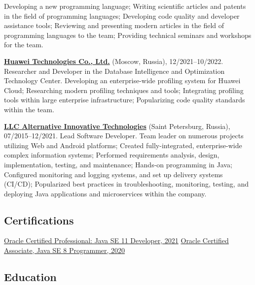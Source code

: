 \documentclass{vl}
\begin{document}
    Developing a new programming language;
    Writing scientific articles and patents in the field of programming languages;
    Developing code quality and developer assistance tools;
    Reviewing and presenting modern articles in the field of programming languages to the team;
    Providing technical seminars and workshops for the team.

    \textbf{\href{https://www.huawei.com}{Huawei Technologies Co., Ltd.}} (Moscow, Russia), 12/2021--10/2022.\newline
    Researcher and Developer in the Database Intelligence and Optimization Technology Center.\newline
    Developing an enterprise-wide profiling system for Huawei Cloud;
    Researching modern profiling techniques and tools;
    Integrating profiling tools within large enterprise infrastructure;
    Popularizing code quality standards within the team.

    \textbf{\href{https://altinntech.com/en/}{LLC Alternative Innovative Technologies}} (Saint Petersburg, Russia), 07/2015--12/2021.
    Lead Software Developer.\newline
    Team leader on numerous projects utilizing Web and Android platforms;
    Created fully-integrated, enterprise-wide complex information systems;
    Performed requirements analysis, design, implementation, testing, and maintenance;
    Hands-on programming in Java;
    Configured monitoring and logging systems, and set up delivery systems (CI/CD);
    Popularized best practices in troubleshooting, monitoring, testing, and deploying Java applications
    and microservices within the company.

    \subsection*{Certifications}

    \href{https://catalog-education.oracle.com/pls/certview/sharebadge?id=87F6A2FE819A5A5AF4120A05900AB28A461EE9A3EE9FBFA02721FADAEB3BCE19}{Oracle Certified Professional: Java SE 11 Developer, 2021}
    \newline
    \href{https://www.credly.com/badges/e2d9ddda-20dc-433d-8ab7-18548fd0fd8f/public_url}{Oracle Certified Associate, Java SE 8 Programmer, 2020}
    \newline

    \subsection*{Education}
\end{document}
